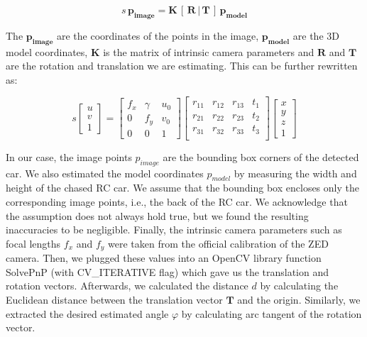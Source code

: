 \documentclass{ctuthesis/ctuthesis}
\begin{document}
\begin{equation}
s\,\mathbf{p_{image}} = \mathbf{K}\,[\,\mathbf{R}\, |\, \mathbf{T}\, ]\, \mathbf{p_{model}}
\end{equation}

The $\mathbf{p_{image}}$ are the coordinates of the points in the image, $\mathbf{p_{model}}$ are the 3D model coordinates, $\mathbf{K}$ is the matrix of intrinsic camera parameters and $\mathbf{R}$ and $\mathbf{T}$ are the rotation and translation we are estimating. This can be further rewritten as: \par


\begin{equation}
s\begin{bmatrix}u\\v\\1\end{bmatrix} = \begin{bmatrix}
f_x & \gamma & u_0\\
0 & f_y & v_0\\
0 & 0 & 1
\end{bmatrix}\begin{bmatrix}
r_{11} & r_{12} & r_{13} & t_{1}\\
r_{21} & r_{22} & r_{23} & t_{2}\\
r_{31} & r_{32} & r_{33} & t_{3}\\
\end{bmatrix}
\begin{bmatrix}x\\y\\z\\1\end{bmatrix}
\end{equation}

In our case, the image points $p_{image}$ are the bounding box corners of the detected car. We also estimated the model coordinates $p_{model}$ by measuring the width and height of the chased RC car. We assume that the bounding box encloses only the corresponding image points, i.e., the back of the RC car. We acknowledge that the assumption does not always hold true, but we found the resulting inaccuracies to be negligible. Finally, the intrinsic camera parameters such as focal lengths $f_x$ and $f_y$ were taken from the official calibration of the ZED camera. Then, we plugged these values into an OpenCV \cite{opencv_library} library function SolvePnP (with CV\_ITERATIVE flag) which gave us the translation and rotation vectors. Afterwards, we calculated the distance $d$ by calculating the Euclidean distance between the translation vector $\mathbf{T}$ and the origin. Similarly, we extracted the desired estimated angle $\varphi$ by calculating arc tangent of the rotation vector. 
\end{document}
